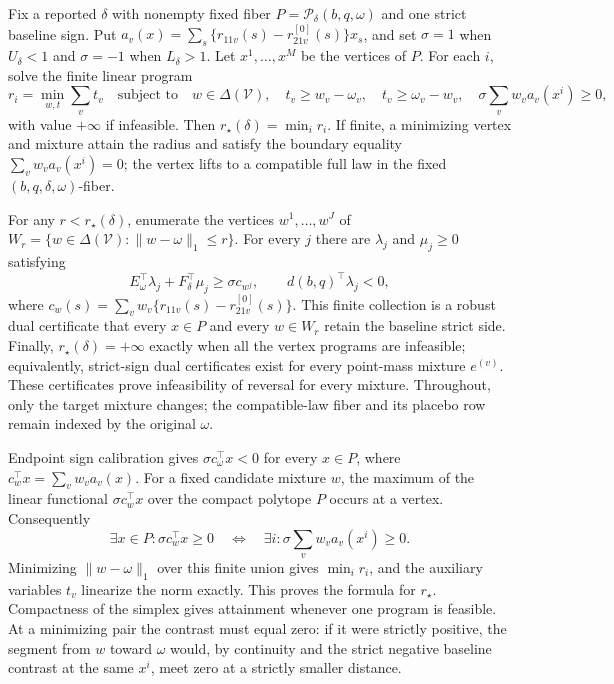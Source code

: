Fix a reported \(\delta\) with nonempty fixed fiber \(P=\mathcal P_\delta(b,q,\omega)\) and one strict baseline sign.  Put \(a_v(x)=\sum_s\{r_{11v}(s)-r^{[0]}_{21v}(s)\}x_s\), and set \(\sigma=1\) when \(U_\delta<1\) and \(\sigma=-1\) when \(L_\delta>1\).  Let \(x^1,\ldots,x^M\) be the vertices of \(P\).  For each \(i\), solve the finite linear program
\[
r_i=\min_{w,t}\sum_vt_v
\quad\text{subject to}\quad w\in\Delta(\mathcal V),\quad
t_v\geq w_v-\omega_v,\quad t_v\geq\omega_v-w_v,\quad
\sigma\sum_vw_va_v(x^i)\geq0,
\]
with value \(+\infty\) if infeasible.  Then \(r_\star(\delta)=\min_i r_i\).  If finite, a minimizing vertex and mixture attain the radius and satisfy the boundary equality \(\sum_vw_va_v(x^i)=0\); the vertex lifts to a compatible full law in the fixed \((b,q,\delta,\omega)\)-fiber.

For any \(r<r_\star(\delta)\), enumerate the vertices \(w^1,\ldots,w^J\) of \(W_r=\{w\in\Delta(\mathcal V):\lVert w-\omega\rVert_1\leq r\}\).  For every \(j\) there are \(\lambda_j\) and \(\mu_j\geq0\) satisfying
\[
E_\omega^\top\lambda_j+F_\delta^\top\mu_j\geq \sigma c_{w^j},
\qquad d(b,q)^\top\lambda_j<0,
\]
where \(c_w(s)=\sum_vw_v\{r_{11v}(s)-r^{[0]}_{21v}(s)\}\).  This finite collection is a robust dual certificate that every \(x\in P\) and every \(w\in W_r\) retain the baseline strict side.  Finally, \(r_\star(\delta)=+\infty\) exactly when all the vertex programs are infeasible; equivalently, strict-sign dual certificates exist for every point-mass mixture \(e^{(v)}\).  These certificates prove infeasibility of reversal for every mixture.  Throughout, only the target mixture changes; the compatible-law fiber and its placebo row remain indexed by the original \(\omega\).

Endpoint sign calibration gives \(\sigma c_\omega^\top x<0\) for every \(x\in P\), where \(c_w^\top x=\sum_vw_va_v(x)\).  For a fixed candidate mixture \(w\), the maximum of the linear functional \(\sigma c_w^\top x\) over the compact polytope \(P\) occurs at a vertex.  Consequently
\[
\exists x\in P:\sigma c_w^\top x\geq0
\quad\Longleftrightarrow\quad
\exists i:\sigma\sum_vw_va_v(x^i)\geq0.
\]
Minimizing \(\lVert w-\omega\rVert_1\) over this finite union gives \(\min_i r_i\), and the auxiliary variables \(t_v\) linearize the norm exactly.  This proves the formula for \(r_\star\).  Compactness of the simplex gives attainment whenever one program is feasible.  At a minimizing pair the contrast must equal zero: if it were strictly positive, the segment from \(w\) toward \(\omega\) would, by continuity and the strict negative baseline contrast at the same \(x^i\), meet zero at a strictly smaller distance.

